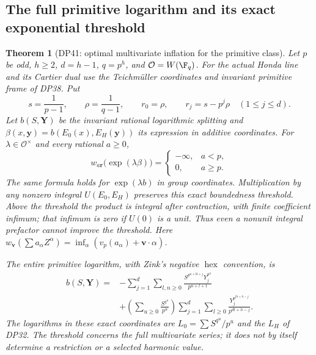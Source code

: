 \documentclass[11pt,a4paper]{article}
\newtheorem{theorem}{Theorem}[section]
\theoremstyle{definition}\newtheorem{remark}[theorem]{Remark}
\newcommand{\vp}{v_p}\newcommand{\dR}{\mathrm{dR}}\newcommand{\crys}{\mathrm{crys}}
\begin{document}
\subsection{The full primitive logarithm and its exact exponential threshold}

\begin{theorem}[DP41: optimal multivariate inflation for the primitive class]\label{DP41}
Let $p$ be odd, $h\ge2$, $d=h-1$, $q=p^h$, and $\mathcal O=W(\F_q)$. For the actual Honda line and its Cartier dual use the Teichm\"uller coordinates and invariant primitive frame of DP38. Put
\[
 s=\frac1{p-1},\qquad \rho=\frac1{q-1},\qquad
 r_0=\rho,\qquad r_j=s-p^j\rho\quad(1\le j\le d).
\]
Let $b(S,\mathbf Y)$ be the invariant rational logarithmic splitting and
$\beta(x,\mathbf y)=b(E_0(x),E_H(\mathbf y))$ its expression in additive coordinates. For $\lambda\in\mathcal O^\times$ and every rational $a\ge0$,
\[
 w_{a\mathbf r}\bigl(\exp(\lambda\beta)\bigr)=
 \begin{cases}-\infty,&a<p,\\0,&a\ge p.\end{cases}
\]
The same formula holds for $\exp(\lambda b)$ in group coordinates. Multiplication by any nonzero integral $U(E_0,E_H)$ preserves this exact boundedness threshold. Above the threshold the product is integral after contraction, with finite coefficient infimum; that infimum is zero if $U(0)$ is a unit. Thus even a nonunit integral prefactor cannot improve the threshold. Here $w_{\mathbf v}(\sum a_\alpha Z^\alpha)=\inf_\alpha(\vp(a_\alpha)+\mathbf v\cdot\alpha)$.

The entire primitive logarithm, with Zink's negative $\operatorname{hex}$ convention, is
\begin{equation}\label{eq:fullprimitive}
\begin{split}
 b(S,\mathbf Y)
 ={}&-\sum_{j=1}^d\sum_{l,n\ge0}
       \frac{S^{p^{n+lh+j}}Y_j^{p^n}}{p^{n+l+1}}\\
 &+\left(\sum_{u\ge0}\frac{S^{q^u}}{p^u}\right)
      \sum_{j=1}^d\sum_{l\ge0}
       \frac{Y_j^{p^{lh+h-j}}}{p^{dl+h-j}}.
\end{split}
\end{equation}
The logarithms in these exact coordinates are $L_0=\sum S^{q^u}/p^u$ and the $L_H$ of DP32. The threshold concerns the full multivariate series; it does not by itself determine a restriction or a selected harmonic value.
\end{theorem}
\end{document}
